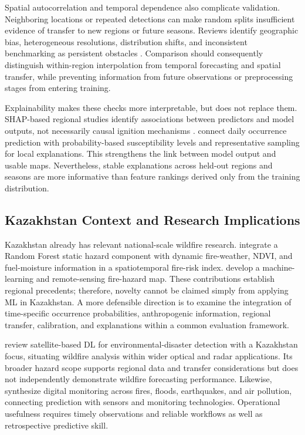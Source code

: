 \documentclass[pdflatex,sn-mathphys-num]{sn-jnl}
\begin{document}
Spatial autocorrelation and temporal dependence also complicate validation. Neighboring locations or repeated detections can make random splits insufficient evidence of transfer to new regions or future seasons. Reviews identify geographic bias, heterogeneous resolutions, distribution shifts, and inconsistent benchmarking as persistent obstacles \cite{xu2025deep,ejaz2025pipeline,galvanlara2026systematic}. Comparison should consequently distinguish within-region interpolation from temporal forecasting and spatial transfer, while preventing information from future observations or preprocessing stages from entering training.

Explainability makes these checks more interpretable, but does not replace them. SHAP-based regional studies identify associations between predictors and model outputs, not necessarily causal ignition mechanisms \cite{iban2024shap,ouazri2026catboost}. \cite{apostolakis2025interpretation} connect daily occurrence prediction with probability-based susceptibility levels and representative sampling for local explanations. This strengthens the link between model output and usable maps. Nevertheless, stable explanations across held-out regions and seasons are more informative than feature rankings derived only from the training distribution.

\subsection{Kazakhstan Context and Research Implications}

Kazakhstan already has relevant national-scale wildfire research. \cite{babu2025sfri} integrate a Random Forest static hazard component with dynamic fire-weather, NDVI, and fuel-moisture information in a spatiotemporal fire-risk index. \cite{chepashev2025maxent} develop a machine-learning and remote-sensing fire-hazard map. These contributions establish regional precedents; therefore, novelty cannot be claimed simply from applying ML in Kazakhstan. A more defensible direction is to examine the integration of time-specific occurrence probabilities, anthropogenic information, regional transfer, calibration, and explanations within a common evaluation framework.

\cite{nurtas2026kazakhstan} review satellite-based DL for environmental-disaster detection with a Kazakhstan focus, situating wildfire analysis within wider optical and radar applications. Its broader hazard scope supports regional data and transfer considerations but does not independently demonstrate wildfire forecasting performance. Likewise, \cite{wilkjakubowski2026hazard} synthesize digital monitoring across fires, floods, earthquakes, and air pollution, connecting prediction with sensors and monitoring technologies. Operational usefulness requires timely observations and reliable workflows as well as retrospective predictive skill.
\end{document}

